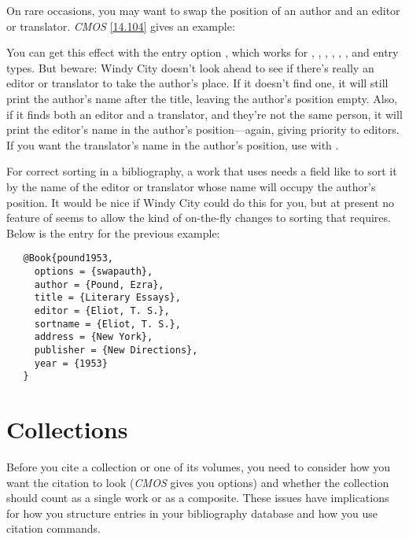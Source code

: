 \documentclass[11pt,letterpaper,oneside]{article}
\begin{document}
On rare occasions, you may want to swap the position of an author and
an editor or translator. \textit{CMOS} \ref{14.104} gives an example:

\begin{citebib}
\item \cite{pound1953}
\end{citebib}

\noindent You can get this effect with the entry option
, which works for , ,
, , ,
, and  entry types. But beware:
Windy City doesn't look ahead to see if there's really an editor or
translator to take the author's place. If it doesn't find one, it will
still print the author's name after the title, leaving the author's
position empty. Also, if it finds both an editor and a translator, and
they're not the same person, it will print the editor's name in the
author's position---again, giving priority to editors. If you want the
translator's name in the author's position, use  with
.

For correct sorting in a bibliography, a work that uses 
needs a field like  to sort it by the name of the
editor or translator whose name will occupy the author's position. It
would be nice if Windy City could do this for you, but at present no
feature of \biblatex seems to allow the kind of on-the-fly changes to
sorting that  requires. Below is the entry for the
previous example:

\begin{verbatim}
   @Book{pound1953,
     options = {swapauth},
     author = {Pound, Ezra},
     title = {Literary Essays},
     editor = {Eliot, T. S.},
     sortname = {Eliot, T. S.},
     address = {New York},
     publisher = {New Directions},
     year = {1953}
   }
\end{verbatim}

\section{Collections}
\label{collections}

Before you cite a collection or one of its volumes, you need to
consider how you want the citation to look (\textit{CMOS} gives you
options) and whether the collection should count as a single work or
as a composite. These issues have implications for how you structure
entries in your bibliography database and how you use citation
commands.
\end{document}
